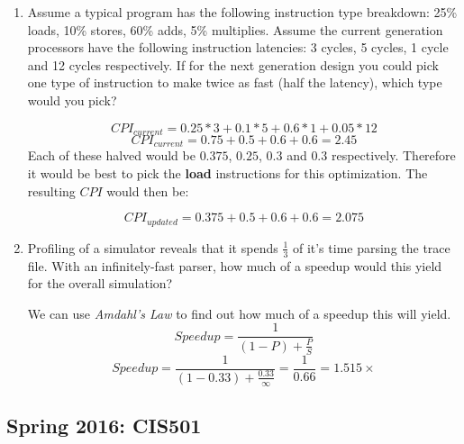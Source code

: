 \documentclass[12pt]{article}
\newenvironment{QandA}{\begin{enumerate}[label=\bfseries\arabic*.]\bfseries}
                      {\end{enumerate}}
\newenvironment{answered}{\par\quad\normalfont}{}
\begin{document}
\begin{QandA}
   \item Assume a typical program has the following instruction type breakdown: 25\% loads, 10\% stores, 60\% adds, 5\% multiplies. Assume the current generation processors have the following instruction latencies: 3 cycles, 5 cycles, 1 cycle and 12 cycles respectively. If for the next generation design you could pick one type of instruction to make twice as fast (half the latency), which type would you pick?
        \begin{answered}
        \begin{equation*}
            CPI_{current} = 0.25 * 3 + 0.1 * 5 + 0.6 * 1 + 0.05 * 12
        \end{equation*}
        \begin{equation*}
            CPI_{current} = 0.75 + 0.5 + 0.6 + 0.6 = 2.45
        \end{equation*}
        Each of these halved would be $0.375$, $0.25$, $0.3$ and $0.3$ respectively. Therefore it would be best to pick the \textbf{load} instructions for this optimization. The resulting $CPI$ would then be:
        
        \begin{equation*}
            CPI_{updated} = 0.375 + 0.5 + 0.6 + 0.6 = 2.075
        \end{equation*}
        \end{answered}
        
    \item Profiling of a simulator reveals that it spends $\frac{1}{3}$ of it's time parsing the trace file. With an infinitely-fast parser, how much of a speedup would this yield for the overall simulation?
        \begin{answered}
        We can use \textit{Amdahl's Law} to find out how much of a speedup this will yield.
        \begin{equation*}
            Speedup = \frac{1}{(1-P) + \frac{P}{S}}
        \end{equation*}
        \begin{equation*}
            Speedup = \frac{1}{(1-0.33) + \frac{0.33}{\infty}} = \frac{1}{0.66} = 1.515 \times 
        \end{equation*}        
        \end{answered}
\end{QandA}

\subsection{Spring 2016: CIS501}
\end{document}
